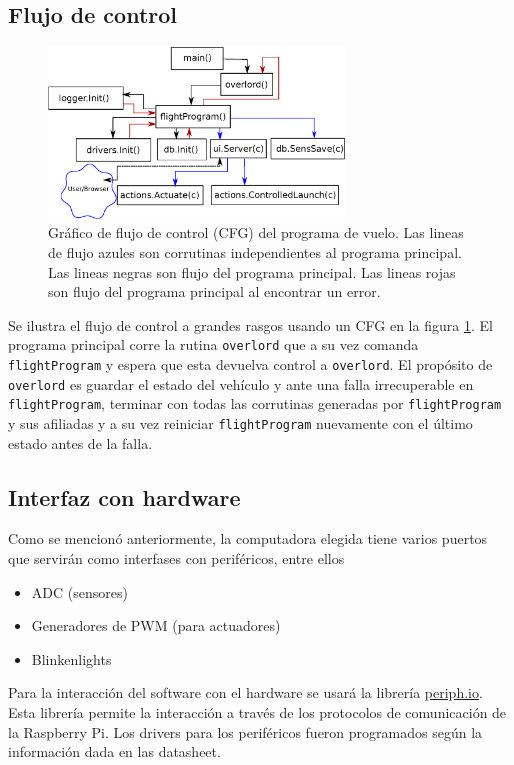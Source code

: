 \newpage

\subsection{Flujo de control}
\begin{figure}[!htb]
    \centering
    \includegraphics[width=0.7\textwidth]{fig/cfg_flightprogram.eps}
    \caption{Gráfico de flujo de control (CFG) del programa de vuelo. Las lineas de flujo azules son corrutinas independientes al programa principal. Las lineas negras son flujo del programa principal. Las lineas rojas son flujo del programa principal al encontrar un error.}
    \label{fig:flightProgram}
\end{figure}

Se ilustra el flujo de control a grandes rasgos usando un CFG en la figura \ref{fig:flightProgram}. El programa principal corre la rutina \texttt{overlord} que a su vez comanda \texttt{flightProgram} y espera que esta devuelva control a \texttt{overlord}. El propósito de \texttt{overlord} es guardar el estado del vehículo y ante una falla irrecuperable en \texttt{flightProgram}, terminar con todas las corrutinas generadas por \texttt{flightProgram} y sus afiliadas y a su vez reiniciar \texttt{flightProgram} nuevamente con el último estado antes de la falla.


\subsection{Interfaz con hardware}

Como se mencionó anteriormente, la computadora elegida tiene varios puertos que servirán como interfases con periféricos, entre ellos 

\begin{itemize}
    \item ADC (sensores)
    \item Generadores de PWM (para actuadores)
    \item Blinkenlights
\end{itemize}

Para la interacción del software con el hardware se usará la librería \href{https://periph.io}{periph.io}. Esta librería permite la interacción a través de los protocolos de comunicación de la Raspberry Pi. Los drivers para los periféricos fueron programados según la información dada en las datasheet.




